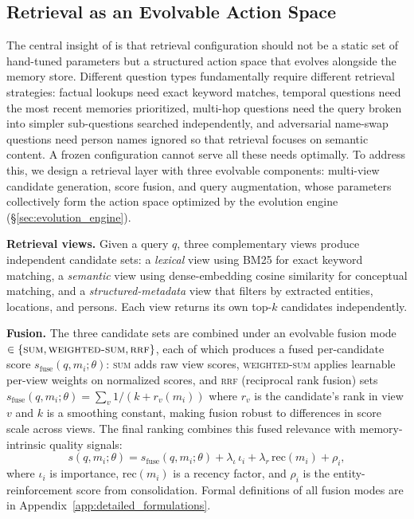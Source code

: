 \subsection{Retrieval as an Evolvable Action Space}
\label{sec:retrieval}

The central insight of \ours{} is that retrieval configuration should not be a static set of hand-tuned parameters but a structured action space that evolves alongside the memory store. Different question types fundamentally require different retrieval strategies: factual lookups need exact keyword matches, temporal questions need the most recent memories prioritized, multi-hop questions need the query broken into simpler sub-questions searched independently, and adversarial name-swap questions need person names ignored so that retrieval focuses on semantic content. A frozen configuration cannot serve all these needs optimally. To address this, we design a retrieval layer with three evolvable components: multi-view candidate generation, score fusion, and query augmentation, whose parameters collectively form the action space optimized by the evolution engine (\S\ref{sec:evolution_engine}).

\noindent \textbf{Retrieval views.} Given a query $q$, three complementary views produce independent candidate sets: a \emph{lexical} view using BM25 for exact keyword matching, a \emph{semantic} view using dense-embedding cosine similarity for conceptual matching, and a \emph{structured-metadata} view that filters by extracted entities, locations, and persons. Each view returns its own top-$k$ candidates independently.

\noindent \textbf{Fusion.} The three candidate sets are combined under an evolvable fusion mode $\in \{\textsc{sum}, \textsc{weighted-sum}, \textsc{rrf}\}$, each of which produces a fused per-candidate score $s_{\text{fuse}}(q, m_i; \theta)$: \textsc{sum} adds raw view scores, \textsc{weighted-sum} applies learnable per-view weights on normalized scores, and \textsc{rrf} (reciprocal rank fusion) sets $s_{\text{fuse}}(q, m_i; \theta) = \sum_v 1/(k + r_v(m_i))$ where $r_v$ is the candidate's rank in view $v$ and $k$ is a smoothing constant, making fusion robust to differences in score scale across views. The final ranking combines this fused relevance with memory-intrinsic quality signals:
\begin{equation}
    s(q, m_i; \theta) = s_{\text{fuse}}(q, m_i; \theta) + \lambda_\iota\, \iota_i + \lambda_r\, \text{rec}(m_i) + \rho_i,
    \label{eq:hybrid_score}
\end{equation}
where $\iota_i$ is importance, $\text{rec}(m_i)$ is a recency factor, and $\rho_i$ is the entity-reinforcement score from consolidation. Formal definitions of all fusion modes are in Appendix~\ref{app:detailed_formulations}.

